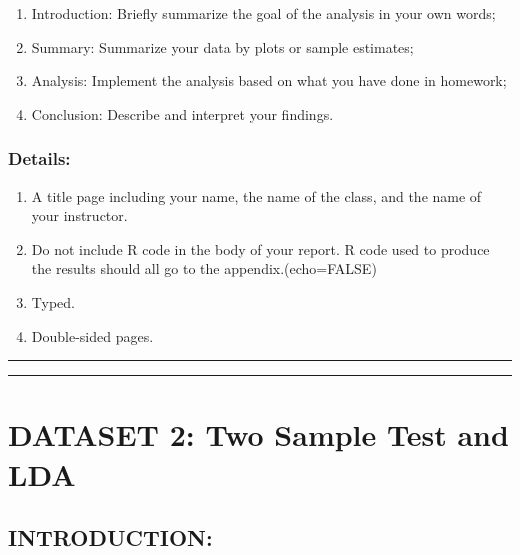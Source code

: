 \documentclass[]{article}
\providecommand{\tightlist}{%
  \setlength{\itemsep}{0pt}\setlength{\parskip}{0pt}}
\begin{document}
\begin{enumerate}
\def\labelenumi{\arabic{enumi})}
\tightlist
\item
  Introduction: Briefly summarize the goal of the analysis in your own
  words;
\item
  Summary: Summarize your data by plots or sample estimates;
\item
  Analysis: Implement the analysis based on what you have done in
  homework;
\item
  Conclusion: Describe and interpret your findings.
\end{enumerate}

\hypertarget{details}{%
\subsubsection{Details:}\label{details}}

\begin{enumerate}
\def\labelenumi{\arabic{enumi})}
\tightlist
\item
  A title page including your name, the name of the class, and the name
  of your instructor.
\item
  Do not include R code in the body of your report. R code used to
  produce the results should all go to the appendix.(echo=FALSE)
\item
  Typed.
\item
  Double-sided pages.
\end{enumerate}

\begin{center}\rule{0.5\linewidth}{0.5pt}\end{center}

\newpage

\newpage

\begin{center}\rule{0.5\linewidth}{0.5pt}\end{center}

\hypertarget{dataset-2-two-sample-test-and-lda}{%
\section{DATASET 2: Two Sample Test and
LDA}\label{dataset-2-two-sample-test-and-lda}}

\hypertarget{introduction}{%
\subsection{INTRODUCTION:}\label{introduction}}
\end{document}
